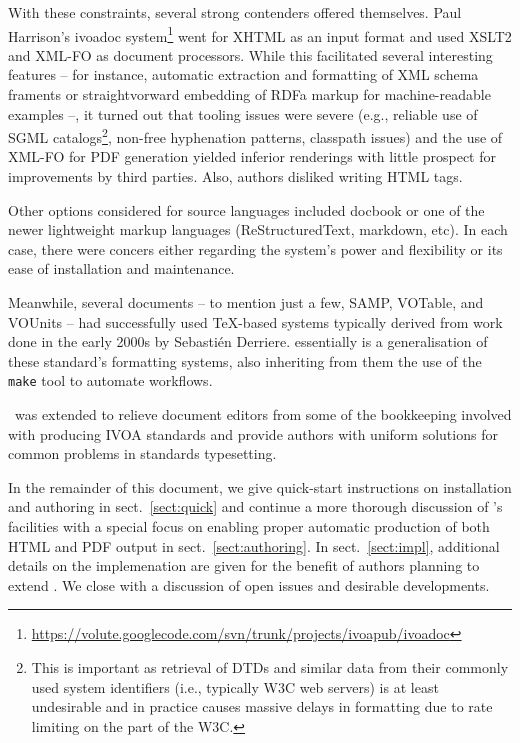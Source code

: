 \documentclass[11pt,a4paper]{ivoa}
\begin{document}
With these constraints, several strong contenders offered themselves.  Paul
Harrison's ivoadoc
system\footnote{\url{https://volute.googlecode.com/svn/trunk/projects/ivoapub/ivoadoc}} 
went for XHTML as
an input format and used XSLT2 and XML-FO as document processors.  While
this facilitated several interesting features  -- for instance,
automatic extraction and formatting of XML schema framents or
straightvorward embedding of RDFa markup for machine-readable examples
--, it turned out that tooling issues were severe (e.g., reliable use
of SGML catalogs\footnote{This is important as retrieval of DTDs and
similar data from their commonly used system identifiers (i.e.,
typically W3C web servers) is at least undesirable and in practice
causes massive delays in formatting due to rate limiting on the part of
the W3C.}, non-free hyphenation patterns, classpath issues) and the use
of XML-FO for PDF generation yielded inferior renderings with little
prospect for improvements by third parties. Also, authors disliked
writing HTML tags.

Other options considered for source languages included docbook or one of
the newer lightweight markup languages (ReStructuredText, markdown,
etc).  In each case, there were concers either regarding the system's power
and flexibility or its ease of installation and maintenance.

Meanwhile, several documents -- to mention just a few, SAMP, VOTable,
and VOUnits -- had successfully used \TeX-based systems typically
derived from work done in the early 2000s by Sebasti\'en Derriere.
\ivoatex essentially is a generalisation of these standard's formatting
systems, also inheriting from them the use of the \texttt{make} tool to
automate workflows.

\ivoatex\ was extended to relieve document editors from some of the
bookkeeping involved with producing IVOA standards and provide authors
with uniform solutions for common problems in standards typesetting.

In the remainder of this document, we give quick-start instructions
on installation and authoring in sect.~\ref{sect:quick} and continue
a more thorough discussion of \ivoatex's facilities with a special focus
on enabling proper automatic production of both HTML and PDF output in
sect.~\ref{sect:authoring}.  In sect.~\ref{sect:impl}, additional
details on the implemenation are given for the benefit of authors
planning to extend \ivoatex.  We close with a discussion of open issues
and desirable developments.
\end{document}
